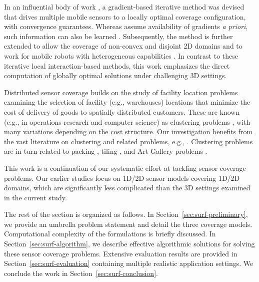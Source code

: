 In an influential body of work \cite{cortes2004coverage,martinez2007motion}, 
a gradient-based iterative method was devised that drives multiple mobile sensors to a locally optimal coverage configuration, with 
convergence guarantees. 
%
Whereas \cite{cortes2004coverage,martinez2007motion} assume availability of gradients {\em a priori}, 
such information can also be learned \cite{schwager2009decentralized}. 
%
Subsequently, the method is further extended to allow the coverage of non-convex and disjoint 2D domains \cite{schwager2009optimal} 
and to work for mobile robots with heterogeneous capabilities \cite{pierson2017adapting}. 
%
In contrast to these iterative local interaction-based methods, 
this work emphasizes the direct computation of globally optimal solutions under challenging 3D settings. 

Distributed sensor coverage \cite{cortes2004coverage,schwager2009decentralized} builds on the study of 
facility location problems \cite{weber1929theory,drezner1995facility} examining the selection of facility (e.g., warehouses) locations 
that minimize the cost of delivery of goods to spatially distributed customers. 
These are known (e.g., in operations research and computer science) as clustering problems \cite{har2011geometric}, 
with many variations depending on the cost structure. Our investigation benefits from the vast literature on clustering and related problems, 
e.g., \cite{feder1988optimal,hochbaum1985best,gonzalez1985clustering,daskin2000new,shamos1975closest}.
%
Clustering problems are in turn related to packing \cite{hales2005proof}, tiling \cite{thue1910dichteste}, 
and Art Gallery problems \cite{o1987art,shermer1992recent}.

This work is a continuation of our systematic effort \cite{fenghangaoyu2019efficient,fengyu2020RAL,fengyu2020optimally} at tackling sensor coverage problems. 
Our earlier studies focus on 1D/2D sensor models covering 1D/2D domains, which are significantly less complicated than the 3D settings examined in the current study.

The rest of the section is organized as follows. In Section~\ref{sec:surf-preliminary}, we provide an umbrella problem statement and detail the three coverage models. 
Computational complexity of the formulations is briefly discussed. In Section~\ref{sec:surf-algorithm}, we describe effective algorithmic solutions for solving these sensor coverage problems. 
Extensive evaluation results are provided in Section~\ref{sec:surf-evaluation} containing multiple realistic application settings. We conclude the work in Section~\ref{sec:surf-conclusion}.